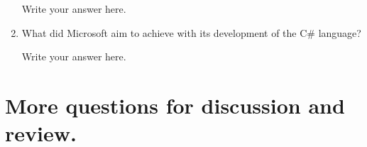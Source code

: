 \begin{enumerate}
  \begin{answer}

    Write your answer here.

    \end{answer}

  \item What did Microsoft aim to achieve with its development of the
    C\# language?

  \begin{answer}

    Write your answer here.

    \end{answer}

  \end{enumerate}



\section{More questions for discussion and review.}

